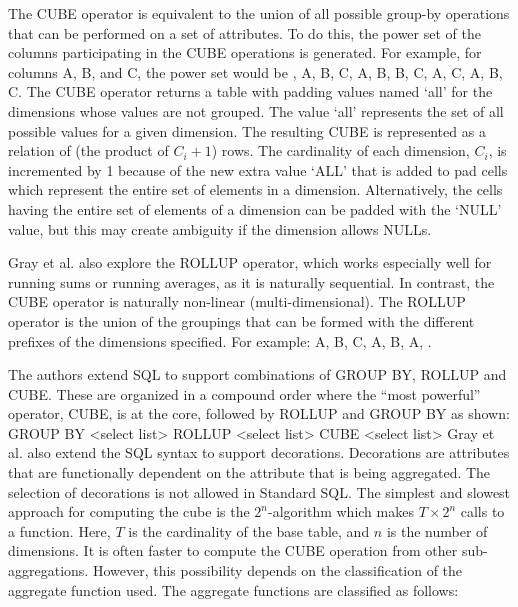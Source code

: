 \documentclass[]{article}
\begin{document}
 The CUBE operator is equivalent to the union of all possible group-by operations that can be performed on a set of
attributes. To do this, the power set of the columns participating in the CUBE operations is generated. For example, for
columns A, B, and C, the power set would be {{}, {A}, {B}, {C}, {A, B}, {B, C}, {A, C}, {A, B, C}}. The CUBE operator returns
a table with padding values named ‘all’ for the dimensions whose values are not grouped. The value ‘all’ represents the set of
all possible values for a given dimension. The resulting CUBE is represented as a relation of (the product of $C_i+1$) rows.
The cardinality of each dimension, $C_i$, is incremented by 1 because of the new extra value ‘ALL’ that is added to pad cells which
represent the entire set of elements in a dimension. Alternatively, the cells having the entire set of elements of a dimension
can be padded with the ‘NULL’ value, but this may create ambiguity if the dimension allows NULLs.
 
Gray et al. also explore the ROLLUP operator, which works especially well for running sums or running averages, as it is
naturally sequential. In contrast, the CUBE operator is naturally non-linear (multi-dimensional). The ROLLUP operator is the
union of the groupings that can be formed with the different prefixes of the dimensions specified. For example: {{A, B, C},
{A, B}, {A}, {}}.

The authors extend SQL to support combinations of GROUP BY, ROLLUP and CUBE. These are organized in a compound order where the
“most powerful” operator, CUBE, is at the core, followed by ROLLUP and GROUP BY as shown:
GROUP BY <select list>
	ROLLUP <select list>
		CUBE <select list>
Gray et al. also extend the SQL syntax to support decorations. Decorations are attributes that are functionally dependent on
the attribute that is being aggregated. The selection of decorations is not allowed in Standard SQL. The simplest and slowest
approach for computing the cube is the $2^n$-algorithm which makes $T\times2^n$ calls to a function. Here, $T$ is the cardinality of
the base table, and $n$ is the number of dimensions. It is often faster to compute the CUBE operation from other
sub-aggregations. However, this possibility depends on the classification of the aggregate function used. The aggregate
functions are classified as follows:
\end{document}
